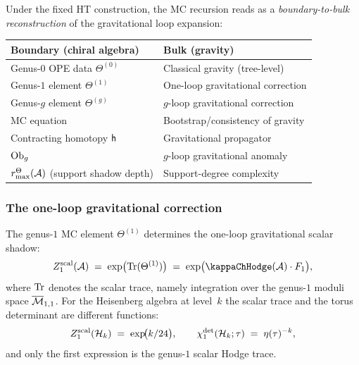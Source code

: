 \begin{principle}
Under the fixed HT construction, the MC recursion reads as a
\emph{boundary-to-bulk reconstruction} of the gravitational loop
expansion:
\begin{center}
\begin{tabular}{ll}
\textbf{Boundary (chiral algebra)} &
\textbf{Bulk (gravity)} \\
\hline
Genus-$0$ OPE data $\Theta^{(0)}$ &
Classical gravity (tree-level) \\
Genus-$1$ element $\Theta^{(1)}$ &
One-loop gravitational correction \\
Genus-$g$ element $\Theta^{(g)}$ &
$g$-loop gravitational correction \\
MC equation &
Bootstrap/consistency of gravity \\
Contracting homotopy $\mathsf{h}$ &
Gravitational propagator \\
$\mathrm{Ob}_g$ &
$g$-loop gravitational anomaly \\
\(r^\Theta_{\max}(\mathcal{A})\) (support shadow depth) &
Support-degree complexity
\end{tabular}
\end{center}
\end{principle}

\subsubsection{The one-loop gravitational correction}

\begin{theorem}
The genus-$1$ MC element $\Theta^{(1)}$ determines the one-loop
gravitational scalar shadow:
\begin{equation}%
Z_{1}^{\mathrm{scal}}(\cA)
\;=\;
\exp\bigl(\Tr(\Theta^{(1)})\bigr)
\;=\;
\exp\bigl(\kappaChHodge(\cA) \cdot F_1\bigr),
\end{equation}
where $\operatorname{Tr}$ denotes the scalar trace, namely integration over the
genus-$1$ moduli space $\overline{\mathcal{M}}_{1,1}$. For the Heisenberg
algebra at level~$k$ the scalar trace and the torus determinant
are different functions:
\begin{equation}%
Z_{1}^{\mathrm{scal}}(\cH_k)
\;=\;
\exp\!\bigl(k/24\bigr),
\qquad
\chi_{1}^{\mathrm{det}}(\cH_k;\tau)
\;=\;
\eta(\tau)^{-k},
\end{equation}
and only the first expression is the genus-$1$ scalar Hodge trace.
\end{theorem}

